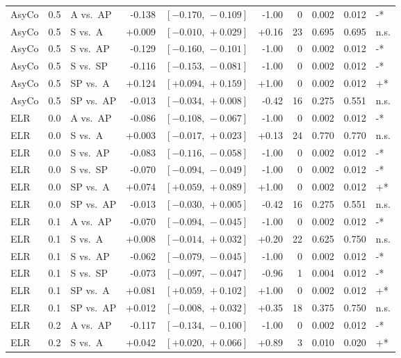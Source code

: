 \begin{landscape}
\begin{scriptsize}
\begin{longtable}{lllrrrrrrl}
AsyCo & 0.5 & A vs.\ AP & -0.138 & $[-0.170,\,-0.109]$ & -1.00 & 0 & 0.002 & 0.012 & -* \\
AsyCo & 0.5 & S vs.\ A & +0.009 & $[-0.010,\,+0.029]$ & +0.16 & 23 & 0.695 & 0.695 & n.s. \\
AsyCo & 0.5 & S vs.\ AP & -0.129 & $[-0.160,\,-0.101]$ & -1.00 & 0 & 0.002 & 0.012 & -* \\
AsyCo & 0.5 & S vs.\ SP & -0.116 & $[-0.153,\,-0.081]$ & -1.00 & 0 & 0.002 & 0.012 & -* \\
AsyCo & 0.5 & SP vs.\ A & +0.124 & $[+0.094,\,+0.159]$ & +1.00 & 0 & 0.002 & 0.012 & +* \\
AsyCo & 0.5 & SP vs.\ AP & -0.013 & $[-0.034,\,+0.008]$ & -0.42 & 16 & 0.275 & 0.551 & n.s. \\
ELR & 0.0 & A vs.\ AP & -0.086 & $[-0.108,\,-0.067]$ & -1.00 & 0 & 0.002 & 0.012 & -* \\
ELR & 0.0 & S vs.\ A & +0.003 & $[-0.017,\,+0.023]$ & +0.13 & 24 & 0.770 & 0.770 & n.s. \\
ELR & 0.0 & S vs.\ AP & -0.083 & $[-0.116,\,-0.058]$ & -1.00 & 0 & 0.002 & 0.012 & -* \\
ELR & 0.0 & S vs.\ SP & -0.070 & $[-0.094,\,-0.049]$ & -1.00 & 0 & 0.002 & 0.012 & -* \\
ELR & 0.0 & SP vs.\ A & +0.074 & $[+0.059,\,+0.089]$ & +1.00 & 0 & 0.002 & 0.012 & +* \\
ELR & 0.0 & SP vs.\ AP & -0.013 & $[-0.030,\,+0.005]$ & -0.42 & 16 & 0.275 & 0.551 & n.s. \\
ELR & 0.1 & A vs.\ AP & -0.070 & $[-0.094,\,-0.045]$ & -1.00 & 0 & 0.002 & 0.012 & -* \\
ELR & 0.1 & S vs.\ A & +0.008 & $[-0.014,\,+0.032]$ & +0.20 & 22 & 0.625 & 0.750 & n.s. \\
ELR & 0.1 & S vs.\ AP & -0.062 & $[-0.079,\,-0.045]$ & -1.00 & 0 & 0.002 & 0.012 & -* \\
ELR & 0.1 & S vs.\ SP & -0.073 & $[-0.097,\,-0.047]$ & -0.96 & 1 & 0.004 & 0.012 & -* \\
ELR & 0.1 & SP vs.\ A & +0.081 & $[+0.059,\,+0.102]$ & +1.00 & 0 & 0.002 & 0.012 & +* \\
ELR & 0.1 & SP vs.\ AP & +0.012 & $[-0.008,\,+0.032]$ & +0.35 & 18 & 0.375 & 0.750 & n.s. \\
ELR & 0.2 & A vs.\ AP & -0.117 & $[-0.134,\,-0.100]$ & -1.00 & 0 & 0.002 & 0.012 & -* \\
ELR & 0.2 & S vs.\ A & +0.042 & $[+0.020,\,+0.066]$ & +0.89 & 3 & 0.010 & 0.020 & +* \\

\end{longtable}
\end{scriptsize}
\end{landscape}
